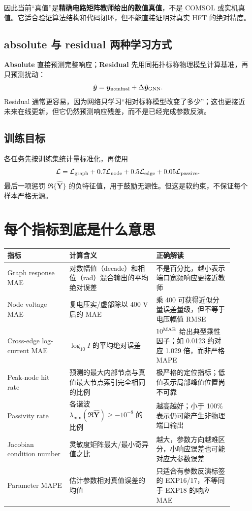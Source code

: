 \documentclass[UTF8,11pt,a4paper]{ctexart}
\newcommand{\mat}[1]{\bm{#1}}
\newcommand{\key}[1]{\textcolor{deep}{\textbf{#1}}}
\begin{document}
因此当前“真值”是\key{精确电路矩阵教师给出的数值真值}，不是 COMSOL 或实机真值。它适合验证算法结构和代码闭环，但不能直接证明对真实 HFT 的绝对精度。

\subsection{absolute 与 residual 两种学习方式}

\textbf{Absolute} 直接预测完整响应；\textbf{Residual} 先用同拓扑标称物理模型计算基准，再只预测扰动：
\begin{equation}
 \hat{\mat y}=\mat y_{\rm nominal}+\Delta\hat{\mat y}_{\rm GNN}.
\end{equation}
Residual 通常更容易，因为网络只学习“相对标称模型改变了多少”；这也更接近未来在线更新，但它仍然预测响应残差，而不是已经完成参数反演。

\subsection{训练目标}

各任务先按训练集统计量标准化，再使用
\begin{equation}
 \mathcal L=\mathcal L_{\rm graph}+0.7\mathcal L_{\rm node}
 +0.5\mathcal L_{\rm edge}+0.05\mathcal L_{\rm passive}.
\end{equation}
最后一项惩罚 $\Re\{\hat{\mat Y}\}$ 的负特征值，用于鼓励无源性。但这是软约束，不保证每个样本严格无源。

\section{每个指标到底是什么意思}

\begin{longtable}{p{0.25\linewidth}p{0.35\linewidth}p{0.31\linewidth}}
\toprule
指标 & 计算含义 & 正确解读\\
\midrule
Graph response MAE & 对数幅值（decade）和相位（rad）混合输出的平均绝对误差 & 不是百分比，越小表示端口宽频响应更接近教师\\
Node voltage MAE & 复电压实/虚部除以 400 V 后的 MAE & 乘 400 可获得近似分量误差量级，但不等于电压幅值 RMSE\\
Cross-edge log-current MAE & $\log_{10}I$ 的平均绝对误差 & $10^{\rm MAE}$ 给出典型乘性因子；如 0.0123 约对应 1.029 倍，而非严格 MAPE\\
Peak-node hit rate & 预测的最大内部节点与真值最大节点索引完全相同的比例 & 极严格的定位指标；低值表示局部峰值位置尚不可靠\\
Passivity rate & 各谐波 $\lambda_{\min}(\Re\hat{\mat Y})\ge-10^{-8}$ 的比例 & 越高越好；小于 100\% 表示仍可能产生非物理端口输出\\
Jacobian condition number & 灵敏度矩阵最大/最小奇异值之比 & 越大，参数方向越难区分，小响应误差也可能对应大参数误差\\
Parameter MAPE & 估计参数相对真值误差的均值 & 只适合有参数反演标签的 EXP16/17，不等同于 EXP18 的响应 MAE\\
\bottomrule
\end{longtable}
\end{document}
